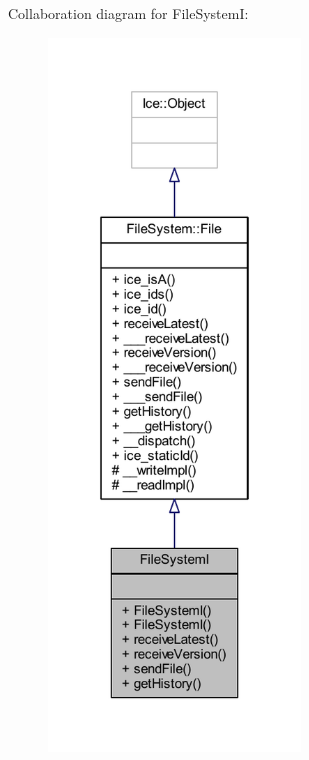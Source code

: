 Collaboration diagram for File\+System\+I\+:
\nopagebreak
\begin{figure}[H]
\begin{center}
\leavevmode
\includegraphics[width=190pt]{class_file_system_i__coll__graph}
\end{center}
\end{figure}
